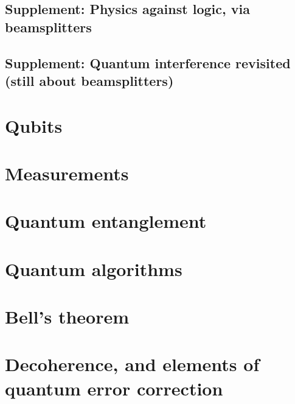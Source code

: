\documentclass[
]{book}
\theoremstyle{definition}
\theoremstyle{definition}
\theoremstyle{definition}
\theoremstyle{remark}
\begin{document}
\hypertarget{supplement-physics-against-logic-via-beamsplitters}{%
\section{Supplement: Physics against logic, via beamsplitters}\label{supplement-physics-against-logic-via-beamsplitters}}

\hypertarget{supplement-quantum-interference-revisited-still-about-beamsplitters}{%
\section{Supplement: Quantum interference revisited (still about beamsplitters)}\label{supplement-quantum-interference-revisited-still-about-beamsplitters}}

\hypertarget{qubits}{%
\chapter{Qubits}\label{qubits}}

\hypertarget{measurements}{%
\chapter{Measurements}\label{measurements}}

\hypertarget{quantum-entanglement}{%
\chapter{Quantum entanglement}\label{quantum-entanglement}}

\hypertarget{quantum-algorithms}{%
\chapter{Quantum algorithms}\label{quantum-algorithms}}

\hypertarget{bells-theorem}{%
\chapter{Bell's theorem}\label{bells-theorem}}

\hypertarget{decoherence-and-elements-of-quantum-error-correction}{%
\chapter{Decoherence, and elements of quantum error correction}\label{decoherence-and-elements-of-quantum-error-correction}}
\end{document}

